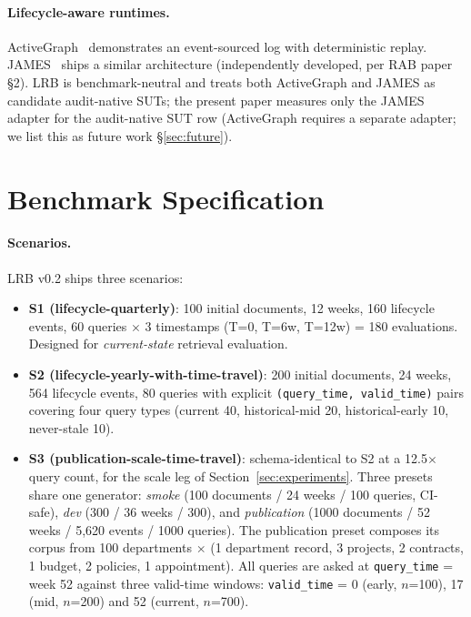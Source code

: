 \documentclass[11pt,a4paper]{article}
\begin{document}
\paragraph{Lifecycle-aware runtimes.} ActiveGraph~\cite{nakajima2026activegraph} demonstrates an event-sourced log with deterministic replay. JAMES~\cite{jamesrepo} ships a similar architecture (independently developed, per RAB paper~\cite{seo2026rab} \S2). LRB is benchmark-neutral and treats both ActiveGraph and JAMES as candidate audit-native SUTs; the present paper measures only the JAMES adapter for the audit-native SUT row (ActiveGraph requires a separate adapter; we list this as future work \S\ref{sec:future}).

\section{Benchmark Specification}
\label{sec:spec}

\paragraph{Scenarios.} LRB v0.2 ships three scenarios:

\begin{itemize}[leftmargin=*]
  \item \textbf{S1 (lifecycle-quarterly)}: 100 initial documents, 12 weeks, 160 lifecycle events, 60 queries $\times$ 3 timestamps (T=0, T=6w, T=12w) = 180 evaluations. Designed for \emph{current-state} retrieval evaluation.
  \item \textbf{S2 (lifecycle-yearly-with-time-travel)}: 200 initial documents, 24 weeks, 564 lifecycle events, 80 queries with explicit \texttt{(query\_time, valid\_time)} pairs covering four query types (current 40, historical-mid 20, historical-early 10, never-stale 10).
  \item \textbf{S3 (publication-scale-time-travel)}: schema-identical to S2 at a 12.5$\times$ query count, for the scale leg of Section~\ref{sec:experiments}. Three presets share one generator: \emph{smoke} (100 documents / 24 weeks / 100 queries, CI-safe), \emph{dev} (300 / 36 weeks / 300), and \emph{publication} (1000 documents / 52 weeks / 5{,}620 events / 1000 queries). The publication preset composes its corpus from 100 departments $\times$ (1 department record, 3 projects, 2 contracts, 1 budget, 2 policies, 1 appointment). All queries are asked at \texttt{query\_time} = week 52 against three valid-time windows: \texttt{valid\_time} = 0 (early, $n$=100), 17 (mid, $n$=200) and 52 (current, $n$=700).
\end{itemize}
\end{document}
